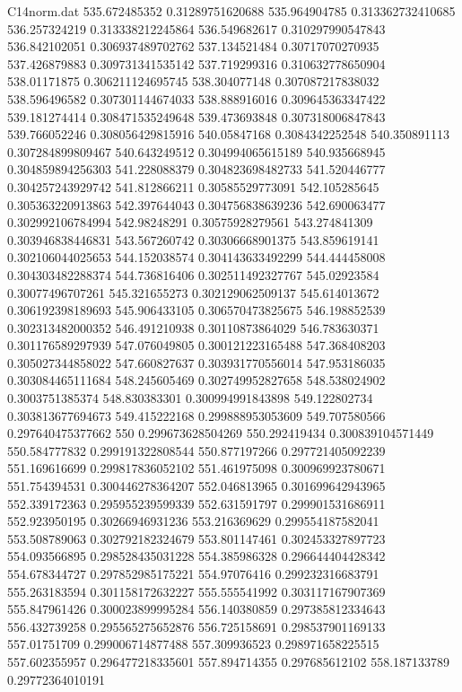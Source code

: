 \begin{filecontents}{C14norm.dat}
535.672485352			0.31289751620688
535.964904785			0.313362732410685
536.257324219			0.313338212245864
536.549682617			0.310297990547843
536.842102051			0.306937489702762
537.134521484			0.30717070270935
537.426879883			0.309731341535142
537.719299316			0.310632778650904
538.01171875			0.306211124695745
538.304077148			0.307087217838032
538.596496582			0.307301144674033
538.888916016			0.309645363347422
539.181274414			0.308471535249648
539.473693848			0.307318006847843
539.766052246			0.308056429815916
540.05847168			0.3084342252548
540.350891113			0.307284899809467
540.643249512			0.304994065615189
540.935668945			0.304859894256303
541.228088379			0.304823698482733
541.520446777			0.304257243929742
541.812866211			0.30585529773091
542.105285645			0.305363220913863
542.397644043			0.304756838639236
542.690063477			0.302992106784994
542.98248291			0.30575928279561
543.274841309			0.303946838446831
543.567260742			0.30306668901375
543.859619141			0.302106044025653
544.152038574			0.304143633492299
544.444458008			0.304303482288374
544.736816406			0.302511492327767
545.02923584			0.30077496707261
545.321655273			0.302129062509137
545.614013672			0.306192398189693
545.906433105			0.306570473825675
546.198852539			0.302313482000352
546.491210938			0.30110873864029
546.783630371			0.301176589297939
547.076049805			0.300121223165488
547.368408203			0.305027344858022
547.660827637			0.303931770556014
547.953186035			0.303084465111684
548.245605469			0.302749952827658
548.538024902			0.3003751385374
548.830383301			0.300994991843898
549.122802734			0.303813677694673
549.415222168			0.299888953053609
549.707580566			0.297640475377662
550			0.299673628504269
550.292419434			0.300839104571449
550.584777832			0.299191322808544
550.877197266			0.297721405092239
551.169616699			0.299817836052102
551.461975098			0.300969923780671
551.754394531			0.300446278364207
552.046813965			0.301699642943965
552.339172363			0.295955239599339
552.631591797			0.299901531686911
552.923950195			0.30266946931236
553.216369629			0.299554187582041
553.508789063			0.302792182324679
553.801147461			0.302453327897723
554.093566895			0.298528435031228
554.385986328			0.296644404428342
554.678344727			0.297852985175221
554.97076416			0.299232316683791
555.263183594			0.301158172632227
555.555541992			0.303117167907369
555.847961426			0.300023899995284
556.140380859			0.297385812334643
556.432739258			0.295565275652876
556.725158691			0.298537901169133
557.01751709			0.299006714877488
557.309936523			0.298971658225515
557.602355957			0.296477218335601
557.894714355			0.297685612102
558.187133789			0.29772364010191

\end{filecontents}
